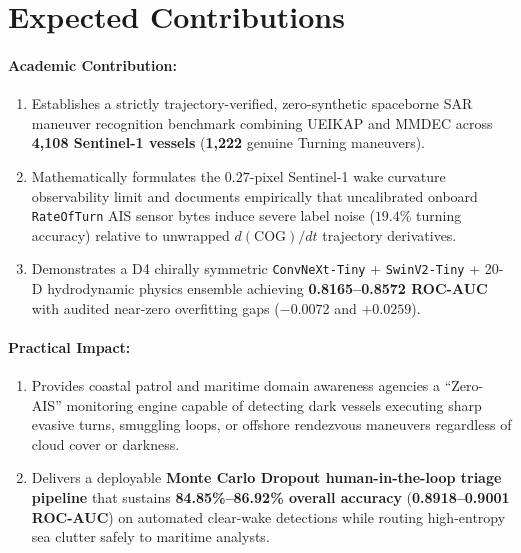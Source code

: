 \documentclass[11pt,a4paper]{article}
\begin{document}
\section{Expected Contributions}

\paragraph{Academic Contribution:}
\begin{enumerate}[leftmargin=1.5em]
    \item Establishes a strictly trajectory-verified, zero-synthetic spaceborne SAR maneuver recognition benchmark combining UEIKAP and MMDEC across \textbf{4,108 Sentinel-1 vessels} (\textbf{1,222} genuine Turning maneuvers).
    \item Mathematically formulates the $0.27$-pixel Sentinel-1 wake curvature observability limit and documents empirically that uncalibrated onboard \texttt{RateOfTurn} AIS sensor bytes induce severe label noise ($19.4\%$ turning accuracy) relative to unwrapped $d(\text{COG})/dt$ trajectory derivatives.
    \item Demonstrates a D4 chirally symmetric \texttt{ConvNeXt-Tiny} + \texttt{SwinV2-Tiny} + 20-D hydrodynamic physics ensemble achieving \textbf{0.8165--0.8572 ROC-AUC} with audited near-zero overfitting gaps ($-0.0072$ and $+0.0259$).
\end{enumerate}

\paragraph{Practical Impact:}
\begin{enumerate}[leftmargin=1.5em]
    \item Provides coastal patrol and maritime domain awareness agencies a ``Zero-AIS'' monitoring engine capable of detecting dark vessels executing sharp evasive turns, smuggling loops, or offshore rendezvous maneuvers regardless of cloud cover or darkness.
    \item Delivers a deployable \textbf{Monte Carlo Dropout human-in-the-loop triage pipeline} that sustains \textbf{84.85\%--86.92\% overall accuracy} (\textbf{0.8918--0.9001 ROC-AUC}) on automated clear-wake detections while routing high-entropy sea clutter safely to maritime analysts.
\end{enumerate}
\end{document}
